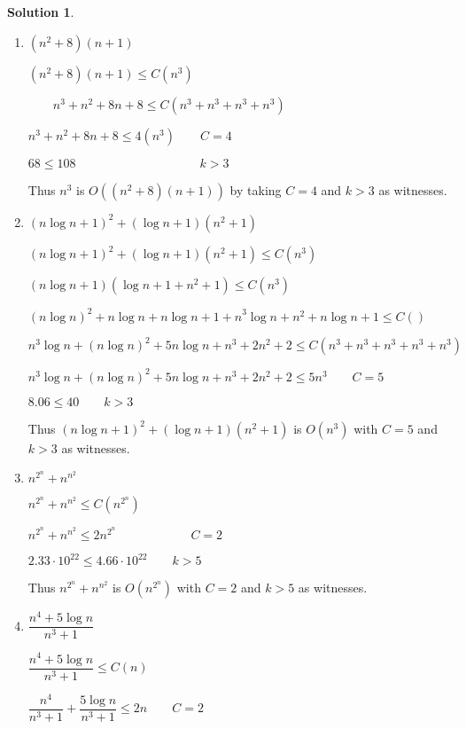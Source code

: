 \documentclass{article}
\theoremstyle{definition}
\newtheorem*{solution}{Solution}
\begin{document}
\begin{solution}
\item \begin{enumerate}
\item $(n^{2}+8)(n+1)$

\qquad $(n^{2}+8)(n+1)\leq C(n^{3})$

$\qquad n^{3}+n^{2}+8n+8\leq C(n^{3}+n^{3}+n^{3}+n^{3})$

\qquad $n^{3}+n^{2}+8n+8\leq 4(n^{3})\qquad C=4$

\qquad $68\leq 108\qquad \qquad \qquad \qquad \qquad k>3$

\qquad Thus $n^{3}$ is $O((n^{2}+8)(n+1))$ by taking $C=4$ and $k>3$ as
witnesses.

\item $(n\log {n}+1)^{2}+(\log {n}+1)(n^{2}+1)$

\qquad $(n\log {n}+1)^{2}+(\log {n}+1)(n^{2}+1)\leq C(n^{3})$

\qquad $(n\log {n}+1)(\log {n}+1+n^{2}+1)\leq C(n^{3})$

\qquad $(n\log {n})^{2}+n\log {n+}n\log {n+1+n}^{3}\log {n}+n^{2}+n\log
n+1\leq C()$

\qquad $n^{3}\log n+(n\log {n})^{2}+5n\log n+n^{3}+2n^{2}+2\leq
C(n^{3}+n^{3}+n^{3}+n^{3}+n^{3})$

\qquad $n^{3}\log n+(n\log {n})^{2}+5n\log n+n^{3}+2n^{2}+2\leq 5n^{3}\qquad
C=5$

\qquad $8.06\leq 40\qquad k>3$

\qquad Thus $(n\log {n}+1)^{2}+(\log {n}+1)(n^{2}+1)$ is $O(n^{3})$ with $C=5
$ and $k>3$ as witnesses.

\qquad

\item $n^{2^{n}}+n^{n^{2}}$

\qquad $n^{2^{n}}+n^{n^{2}}\leq C(n^{2^{n}})$

\qquad $n^{2^{n}}+n^{n^{2}}\leq 2n^{2^{n}}\qquad \qquad \qquad C=2$

\qquad $2.33\cdot 10^{22}\leq 4.66\cdot 10^{22}\qquad k>5$

\qquad Thus $n^{2^{n}}+n^{n^{2}}$ is $O(n^{2^{n}})$ with $C=2$ and $k>5$ as
witnesses.

\item $\dfrac{n^{4}+5\log {n}}{n^{3}+1}$

\qquad $\dfrac{n^{4}+5\log {n}}{n^{3}+1}\leq C(n)$

\qquad $\dfrac{n^{4}}{n^{3}+1}+\dfrac{5\log {n}}{n^{3}+1}\leq 2n\qquad C=2$


\end{enumerate}
\end{solution}
\end{document}
